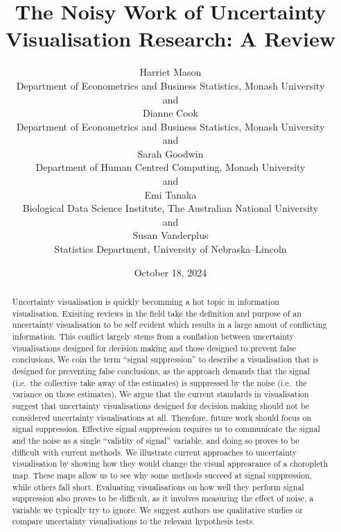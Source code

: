 \documentclass[
  12pt]{article}
\begin{document}
\def\spacingset#1{\renewcommand{\baselinestretch}%
{#1}\small\normalsize} \spacingset{1}



\date{October 18, 2024}
\title{\bf The Noisy Work of Uncertainty Visualisation Research: A
Review}
\author{
Harriet Mason\\
Department of Econometrics and Business Statistics, Monash University\\
and\\Dianne Cook\\
Department of Econometrics and Business Statistics, Monash University\\
and\\Sarah Goodwin\\
Department of Human Centred Computing, Monash University\\
and\\Emi Tanaka\\
Biological Data Science Institute, The Australian National University\\
and\\Susan Vanderplus\\
Statistics Department, University of Nebraska--Lincoln\\
}
\maketitle

\bigskip
\bigskip
\begin{abstract}
Uncertainty visualisation is quickly becomming a hot topic in
information visualisation. Exisiting reviews in the field take the
definition and purpose of an uncertainty visualisation to be self
evident which results in a large amout of conflicting information. This
conflict largely stems from a conflation between uncertainty
visualisations designed for decision making and those designed to
prevent false conclusions. We coin the term ``signal suppression'' to
describe a visualisation that is designed for preventing false
conclusions, as the approach demands that the signal (i.e.~the
collective take away of the estimates) is suppressed by the noise
(i.e.~the variance on those estimates). We argue that the current
standards in visualisation suggest that uncertainty visualisations
designed for decision making should not be considered uncertainty
visualisations at all. Therefore, future work should focus on signal
suppression. Effective signal suppression requires us to communicate the
signal and the noise as a single ``validity of signal'' variable, and
doing so proves to be difficult with current methods. We illustrate
current approaches to uncertainty visualisation by showing how they
would change the visual apprearance of a choropleth map. These maps
allow us to see why some methods succeed at signal suppression, while
others fall short. Evaluating visualisations on how well they perform
signal suppression also proves to be difficult, as it involves measuring
the effect of noise, a variable we typically try to ignore. We suggest
authors use qualitative studies or compare uncertainty visualisations to
the relevant hypothesis tests.
\end{abstract}
\end{document}
